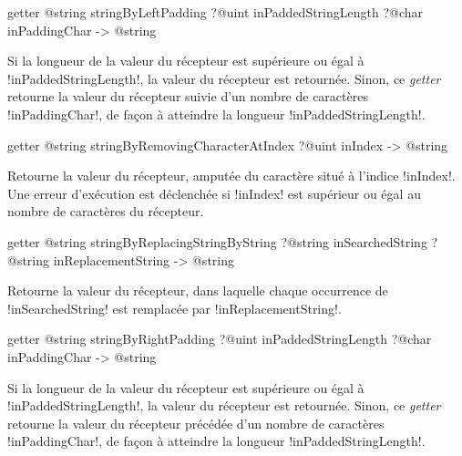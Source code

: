 
\begin{galgas3box}
getter @string stringByLeftPadding
   ?@uint inPaddedStringLength
   ?@char inPaddingChar -> @string
\end{galgas3box}

Si la longueur de la valeur du récepteur est supérieure ou égal à \ggst!inPaddedStringLength!, la valeur du récepteur est retournée. Sinon, ce \emph{getter} retourne la valeur du récepteur suivie d'un nombre de caractères \ggst!inPaddingChar!, de façon à atteindre la longueur \ggst!inPaddedStringLength!.








\begin{galgas3box}
getter @string stringByRemovingCharacterAtIndex ?@uint inIndex -> @string
\end{galgas3box}

Retourne la valeur du récepteur, amputée du caractère situé à l'indice \ggst!inIndex!. Une erreur d'exécution est déclenchée si \ggst!inIndex! est supérieur ou égal au nombre de caractères du récepteur.








\begin{galgas3box}
getter @string stringByReplacingStringByString
     ?@string inSearchedString
     ?@string inReplacementString  -> @string
\end{galgas3box}

Retourne la valeur du récepteur, dans laquelle chaque occurrence de \ggst!inSearchedString! est remplacée par \ggst!inReplacementString!.








\begin{galgas3box}
getter @string stringByRightPadding
   ?@uint inPaddedStringLength
   ?@char inPaddingChar -> @string
\end{galgas3box}

Si la longueur de la valeur du récepteur est supérieure ou égal à \ggst!inPaddedStringLength!, la valeur du récepteur est retournée. Sinon, ce \emph{getter} retourne la valeur du récepteur précédée d'un nombre de caractères \ggst!inPaddingChar!, de façon à atteindre la longueur \ggst!inPaddedStringLength!.





